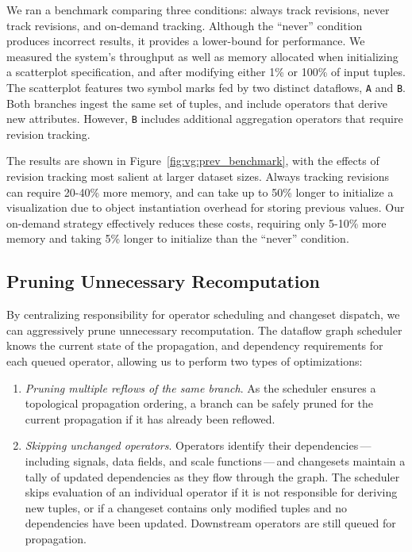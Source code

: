 We ran a benchmark comparing three conditions: always track revisions, never
track revisions, and on-demand tracking. Although the ``never'' condition
produces incorrect results, it provides a lower-bound for performance. We
measured the system's throughput as well as memory allocated when initializing a
scatterplot specification, and after modifying either 1\% or 100\% of input
tuples. The scatterplot features two symbol marks fed by two distinct dataflows,
\texttt{A} and \texttt{B}. Both branches ingest the same set of tuples, and
include operators that derive new attributes. However, \texttt{B} includes
additional aggregation operators that require revision tracking.

The results are shown in Figure~\ref{fig:vg:prev_benchmark}, with the effects of
revision tracking most salient at larger dataset sizes. Always tracking
revisions can require 20-40\% more memory, and can take up to 50\% longer to
initialize a visualization due to object instantiation overhead for storing
previous values. Our on-demand strategy effectively reduces these costs,
requiring only 5-10\% more memory and taking 5\% longer to initialize than the
``never'' condition.

\vspace{-20pt}

\subsection{Pruning Unnecessary Recomputation}
\label{sec:pruning}

\vspace{-7pt}

By centralizing responsibility for operator scheduling and changeset dispatch,
we can aggressively prune unnecessary recomputation. The dataflow graph
scheduler knows the current state of the propagation, and dependency
requirements for each queued operator, allowing us to perform two types of
optimizations:

\begin{enumerate}
  \item \emph{Pruning multiple reflows of the same branch}. As the scheduler
  ensures a topological propagation ordering, a branch can be safely pruned for
  the current propagation if it has already been reflowed.

  \item \emph{Skipping unchanged operators}. Operators identify their
dependencies\,---\,including signals, data fields, and scale functions\,---\,and
changesets maintain a tally of updated dependencies as they flow through the
graph. The scheduler skips evaluation of an individual operator if it is not
responsible for deriving new tuples, or if a changeset contains only modified
tuples and no dependencies have been updated. Downstream operators are still
queued for propagation.
\end{enumerate}

